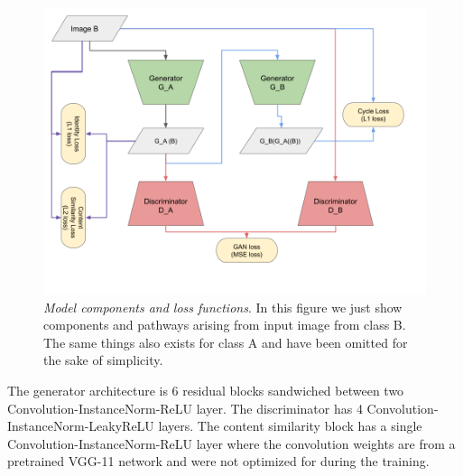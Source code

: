 \documentclass[10pt,twocolumn,letterpaper]{article}
\begin{document}
\begin{figure}
    \begin{center}
        \includegraphics[width=0.99\linewidth]{ccg_model.png}
    \end{center}
   \caption{\textit{Model components and loss functions}. In this figure we
   just show components and pathways arising from input image from class B. The same things also exists for class A and have been omitted for the sake of simplicity.}
    \label{fig:model_and_loss}
\end{figure}

The generator architecture is 6 residual blocks sandwiched between two Convolution-InstanceNorm-ReLU layer. The discriminator has 4 Convolution-InstanceNorm-LeakyReLU layers. The content similarity block has a single Convolution-InstanceNorm-ReLU layer where the convolution weights are from a pretrained VGG-11 network and were not optimized for during the training.
\end{document}
